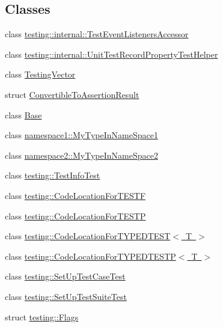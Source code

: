 \subsection*{Classes}
\begin{DoxyCompactItemize}
\item 
class \mbox{\hyperlink{classtesting_1_1internal_1_1_test_event_listeners_accessor}{testing\+::internal\+::\+Test\+Event\+Listeners\+Accessor}}
\item 
class \mbox{\hyperlink{classtesting_1_1internal_1_1_unit_test_record_property_test_helper}{testing\+::internal\+::\+Unit\+Test\+Record\+Property\+Test\+Helper}}
\item 
class \mbox{\hyperlink{class_testing_vector}{Testing\+Vector}}
\item 
struct \mbox{\hyperlink{struct_convertible_to_assertion_result}{Convertible\+To\+Assertion\+Result}}
\item 
class \mbox{\hyperlink{class_base}{Base}}
\item 
class \mbox{\hyperlink{classnamespace1_1_1_my_type_in_name_space1}{namespace1\+::\+My\+Type\+In\+Name\+Space1}}
\item 
class \mbox{\hyperlink{classnamespace2_1_1_my_type_in_name_space2}{namespace2\+::\+My\+Type\+In\+Name\+Space2}}
\item 
class \mbox{\hyperlink{classtesting_1_1_test_info_test}{testing\+::\+Test\+Info\+Test}}
\item 
class \mbox{\hyperlink{classtesting_1_1_code_location_for_t_e_s_t_f}{testing\+::\+Code\+Location\+For\+T\+E\+S\+TF}}
\item 
class \mbox{\hyperlink{classtesting_1_1_code_location_for_t_e_s_t_p}{testing\+::\+Code\+Location\+For\+T\+E\+S\+TP}}
\item 
class \mbox{\hyperlink{classtesting_1_1_code_location_for_t_y_p_e_d_t_e_s_t}{testing\+::\+Code\+Location\+For\+T\+Y\+P\+E\+D\+T\+E\+S\+T$<$ T $>$}}
\item 
class \mbox{\hyperlink{classtesting_1_1_code_location_for_t_y_p_e_d_t_e_s_t_p}{testing\+::\+Code\+Location\+For\+T\+Y\+P\+E\+D\+T\+E\+S\+T\+P$<$ T $>$}}
\item 
class \mbox{\hyperlink{classtesting_1_1_set_up_test_case_test}{testing\+::\+Set\+Up\+Test\+Case\+Test}}
\item 
class \mbox{\hyperlink{classtesting_1_1_set_up_test_suite_test}{testing\+::\+Set\+Up\+Test\+Suite\+Test}}
\item 
struct \mbox{\hyperlink{structtesting_1_1_flags}{testing\+::\+Flags}}
\item 

\end{DoxyCompactItemize}
